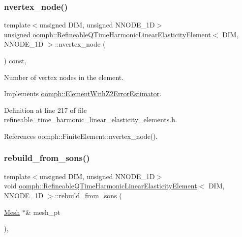 \subsubsection{\texorpdfstring{nvertex\+\_\+node()}{nvertex\_node()}}
{\footnotesize\ttfamily template$<$unsigned D\+IM, unsigned N\+N\+O\+D\+E\+\_\+1D$>$ \\
unsigned \hyperlink{classoomph_1_1RefineableQTimeHarmonicLinearElasticityElement}{oomph\+::\+Refineable\+Q\+Time\+Harmonic\+Linear\+Elasticity\+Element}$<$ D\+IM, N\+N\+O\+D\+E\+\_\+1D $>$\+::nvertex\+\_\+node (\begin{DoxyParamCaption}{ }\end{DoxyParamCaption}) const\hspace{0.3cm}{\ttfamily [inline]}, {\ttfamily [virtual]}}



Number of vertex nodes in the element. 



Implements \hyperlink{classoomph_1_1ElementWithZ2ErrorEstimator_a19495a0e77ef4ff35f15fdf7913b4077}{oomph\+::\+Element\+With\+Z2\+Error\+Estimator}.



Definition at line 217 of file refineable\+\_\+time\+\_\+harmonic\+\_\+linear\+\_\+elasticity\+\_\+elements.\+h.



References oomph\+::\+Finite\+Element\+::nvertex\+\_\+node().

\mbox{\label{classoomph_1_1RefineableQTimeHarmonicLinearElasticityElement_ab7ae9c5375153806dbc28f38ad5b06f4}} 
\subsubsection{\texorpdfstring{rebuild\+\_\+from\+\_\+sons()}{rebuild\_from\_sons()}}
{\footnotesize\ttfamily template$<$unsigned D\+IM, unsigned N\+N\+O\+D\+E\+\_\+1D$>$ \\
void \hyperlink{classoomph_1_1RefineableQTimeHarmonicLinearElasticityElement}{oomph\+::\+Refineable\+Q\+Time\+Harmonic\+Linear\+Elasticity\+Element}$<$ D\+IM, N\+N\+O\+D\+E\+\_\+1D $>$\+::rebuild\+\_\+from\+\_\+sons (\begin{DoxyParamCaption}\item[{\hyperlink{classoomph_1_1Mesh}{Mesh} $\ast$\&}]{mesh\+\_\+pt }\end{DoxyParamCaption})\hspace{0.3cm}{\ttfamily [inline]}, {\ttfamily [virtual]}}



